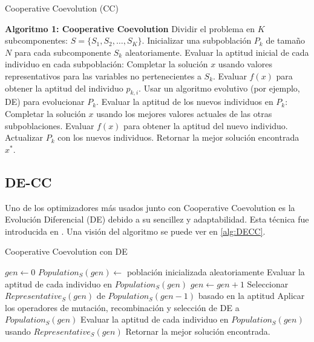 \begin{algorithm}
\caption{Cooperative Coevolution (CC)}
\label{CC}
\begin{algorithmic}[1]
\STATE \textbf{Algoritmo 1: Cooperative Coevolution}
\STATE Dividir el problema en \(K\) subcomponentes: \(S = \{S_1, S_2, \ldots, S_K\}\).
\STATE Inicializar una subpoblación \(P_k\) de tamaño \(N\) para cada subcomponente \(S_k\) aleatoriamente.
\STATE Evaluar la aptitud inicial de cada individuo en cada subpoblación:
        \STATE Completar la solución \(x\) usando valores representativos para las variables no pertenecientes a \(S_k\).
        \STATE Evaluar \(f(x)\) para obtener la aptitud del individuo \(p_{k,i}\).
    \ENDFOR
\ENDFOR
{}
        \STATE Usar un algoritmo evolutivo (por ejemplo, DE) para evolucionar \(P_k\).
        \STATE Evaluar la aptitud de los nuevos individuos en \(P_k\):
            \STATE Completar la solución \(x\) usando los mejores valores actuales de las otras subpoblaciones.
            \STATE Evaluar \(f(x)\) para obtener la aptitud del nuevo individuo.
        \ENDFOR
        \STATE Actualizar \(P_k\) con los nuevos individuos.
    \ENDFOR
\ENDWHILE
\STATE Retornar la mejor solución encontrada \(x^*\).
\end{algorithmic}
\end{algorithm}

\subsection{DE-CC}
Uno de los optimizadores más usados junto con Cooperative Coevolution es la Evolución Diferencial (DE) debido a su sencillez y adaptabilidad. Esta técnica fue introducida en \cite{DECC}. Una visión del algoritmo se puede ver en \ref{alg:DECC}.

\begin{algorithm}
\caption{Cooperative Coevolution con DE}
\label{alg:DECC}
\begin{algorithmic}[1]
\STATE \(gen \leftarrow 0\)
    \STATE \(Population_S(gen) \leftarrow\) población inicializada aleatoriamente
    \STATE Evaluar la aptitud de cada individuo en \(Population_S(gen)\)
\ENDFOR
{}
    \STATE \(gen \leftarrow gen + 1\)
        \STATE Seleccionar \(Representative_S(gen)\) de \(Population_S(gen-1)\) basado en la aptitud
    \ENDFOR
        \STATE Aplicar los operadores de mutación, recombinación y selección de DE a \(Population_S(gen)\)
        \STATE Evaluar la aptitud de cada individuo en \(Population_S(gen)\) usando \(Representative_S(gen)\)
    \ENDFOR
\ENDWHILE
\STATE Retornar la mejor solución encontrada.
\end{algorithmic}
\end{algorithm}

\endinput
